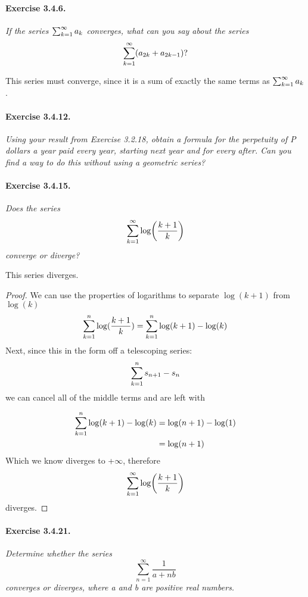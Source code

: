 \documentclass[11pt]{article}
\DeclarePairedDelimiter{\paren}{\lparen}{\rparen}
\begin{document}
\paragraph{Exercise 3.4.6.} \textit{If the series $\sum_{k=1}^{\infty} a_k$ converges, what can you
say about the series} \[ \kinfsum \paren*{a_{2k} + a_{2k-1}}? \]

This series must converge, since it is a sum of exactly the same terms as $\sum_{k=1}^{\infty} a_k$.

\paragraph{Exercise 3.4.12.} \textit{Using your result from Exercise 3.2.18, obtain a formula for
the \emph{perpetuity} of P dollars a year paid every year, starting next year and for every after.
Can you find a way to do this without using a geometric series?}


\paragraph{Exercise 3.4.15.} \textit{Does the series}
\[ \kinfsum \log \paren*{\frac{k+1}{k}} \] \textit{converge or diverge?} \newline

This series diverges. 
\begin{proof}
We can use the properties of logarithms to separate $\log(k+1)$ from $\log(k)$
$$\sum_{k=1}^{n} \log(\frac{k+1}{k}) = \sum_{k=1}^{n} \log(k+1) - \log(k)$$
Next, since this in the form off a telescoping series: 
$$\sum_{k=1}^{n} s_{n+1} - s_n$$ we can cancel all of the middle terms and are left with 

\begin{align*}
\sum_{k=1}^{n} \log(k+1) - \log(k) &= \log(n+1) - \log(1) \\
&= \log(n+1)
\end{align*}
Which we know diverges to +$\infty$, therefore $$\kinfsum \log \paren*{\frac{k+1}{k}}$$ diverges.
\end{proof}

\def \ab {\frac{a}{b}}
\def \harmonic {\frac{1}{n}}
\def \generalharmonic {\frac{1}{bn + a}}
\def \generalharmonictimesb {\frac{1}{n + \ab}}
\paragraph{Exercise 3.4.21.} \textit{Determine whether the series}
\[ \sum_{n=1}^{\infty} \frac{1}{a + nb} \] \textit{converges or diverges, where a and b are positive real numbers.} \newline
\end{document}
